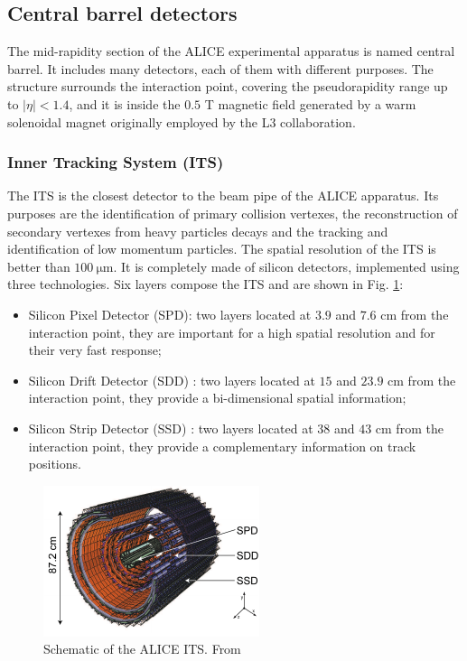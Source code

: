 \subsection{Central barrel detectors}
The mid-rapidity section of the ALICE experimental apparatus is named central barrel.
It includes many detectors, each of them with different purposes.
The structure surrounds the interaction point, covering the pseudorapidity range up to $|\eta| < 1.4$, and it is inside the $0.5$ T magnetic field generated by a warm solenoidal magnet originally employed by the L3 collaboration.

\subsubsection{Inner Tracking System (ITS)}
The ITS is the closest detector to the beam pipe of the ALICE apparatus.
Its purposes are the identification of primary collision vertexes, the reconstruction of secondary vertexes from heavy particles decays and the tracking and identification of low momentum particles.
The spatial resolution of the ITS is better than $100\ \mathrm{\mu m}$.
It is completely made of silicon detectors, implemented using three technologies.
Six layers compose the ITS and are shown in Fig. \ref{fig:ITS}:
\begin{itemize}
    \item Silicon Pixel Detector (SPD): two layers located at $3.9$ and $7.6$ cm from the interaction point, they are important for a high spatial resolution and for their very fast response;
    \item Silicon Drift Detector (SDD) : two layers located at $15$ and $23.9$ cm from the interaction point, they provide a bi-dimensional spatial information;
    \item Silicon Strip Detector (SSD) : two layers located at $38$ and $43$ cm from the interaction point, they provide a complementary information on track positions.
\end{itemize}


\begin{figure}[!h]
\begin{center}
\includegraphics[width=0.7\linewidth]{Chapters/Introduction/Figs/its.pdf}
\caption{Schematic of the ALICE ITS.  From \cite{Aamodt:2010aa}}
\label{fig:ITS}
\end{center}
\end{figure}

